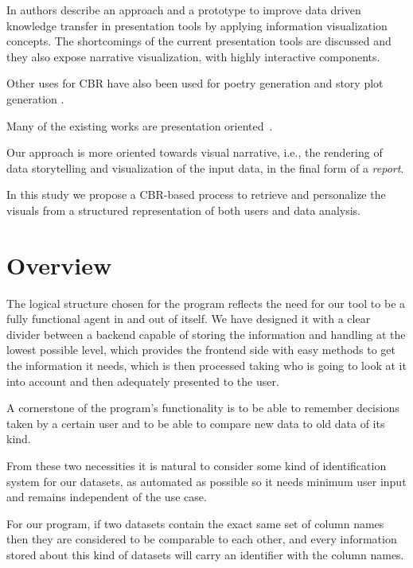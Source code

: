In \cite{Roels2017} authors describe an approach and a prototype to improve data driven knowledge transfer in presentation tools by applying information visualization concepts. 
The shortcomings of the current presentation tools are discussed and they also expose narrative visualization, with highly interactive components.

Other uses for CBR have also been used for poetry generation \cite{diaz2002} and story plot generation \cite{GervasDPH05}. 

Many of the existing works are presentation oriented~\cite{Kosara16,Roels2017}. 

Our approach is more oriented towards visual narrative, i.e., the rendering of data storytelling and visualization of the input data, in the final form of a {\it report}.

In this study we propose a CBR-based process to retrieve and personalize the visuals from a structured representation of both users and data analysis.

\section{Overview}
\label{cap1:sec:overview}

The logical structure chosen for the program reflects the need for our tool to be a fully functional agent in and out of itself. We have designed it with a clear divider between a backend capable of storing the information and handling at the lowest possible level, which provides the frontend side with easy methods to get the information it needs, which is then processed taking who is going to look at it into account and then adequately presented to the user.

A cornerstone of the program's functionality is to be able to remember decisions taken by a certain user and to be able to compare new data to old data of its kind.

From these two necessities it is natural to consider some kind of identification system for our datasets, as automated as possible so it needs minimum user input and remains independent of the use case.

For our program, if two datasets contain the exact same set of column names then they are considered to be comparable to each other, and every information stored about this kind of datasets will carry an identifier with the column names.

